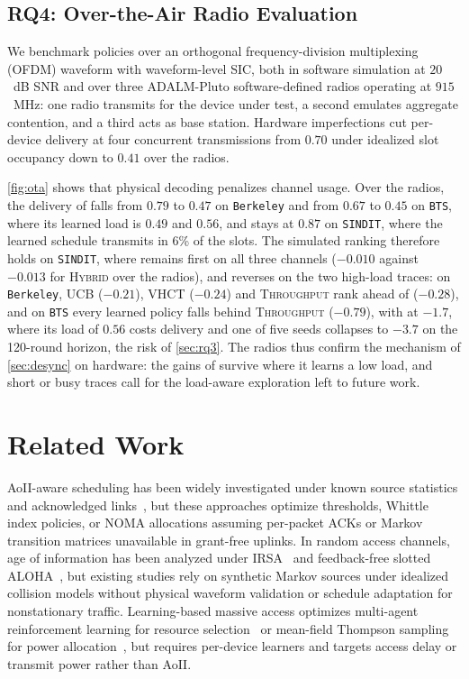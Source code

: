 \documentclass[conference]{IEEEtran}
\begin{document}
\subsection{RQ4: Over-the-Air Radio Evaluation}
\label{sec:rq4}

  We benchmark policies over an orthogonal frequency-division multiplexing (OFDM) waveform with waveform-level SIC, both in software simulation at $20$~dB SNR and over three ADALM-Pluto software-defined radios operating at $915$~MHz: one radio transmits for the device under test, a second emulates aggregate contention, and a third acts as base station.
  Hardware imperfections cut per-device delivery at four concurrent transmissions from $0.70$ under idealized slot occupancy down to $0.41$ over the radios.

  \autoref{fig:ota} shows that physical decoding penalizes channel usage.
  Over the radios, the delivery of \tool falls from $0.79$ to $0.47$ on \texttt{Berkeley} and from $0.67$ to $0.45$ on \texttt{BTS}, where its learned load is $0.49$ and $0.56$, and stays at $0.87$ on \texttt{SINDIT}, where the learned schedule transmits in 6\% of the slots.
  The simulated ranking therefore holds on \texttt{SINDIT}, where \tool remains first on all three channels ($-0.010$ against $-0.013$ for \textsc{Hybrid} over the radios), and reverses on the two high-load traces: on \texttt{Berkeley}, \textsc{UCB} ($-0.21$), \textsc{VHCT} ($-0.24$) and \textsc{Throughput} rank ahead of \tool ($-0.28$), and on \texttt{BTS} every learned policy falls behind \textsc{Throughput} ($-0.79$), with \tool at $-1.7$, where its load of $0.56$ costs delivery and one of five seeds collapses to $-3.7$ on the 120-round horizon, the risk of \autoref{sec:rq3}.
  The radios thus confirm the mechanism of \autoref{sec:desync} on hardware: the gains of \tool survive where it learns a low load, and short or busy traces call for the load-aware exploration left to future work.

\section{Related Work}
\label{sec:related}

  AoII-aware scheduling has been widely investigated under known source statistics and acknowledged links~\cite{maatouk2022age,bountrogiannis2024age,kriouile2023when,hong2024age,tong2023semantic}, but these approaches optimize thresholds, Whittle index policies, or NOMA allocations assuming per-packet ACKs or Markov transition matrices unavailable in grant-free uplinks.
  In random access channels, age of information has been analyzed under IRSA~\cite{munari2021modern,saha2021minimum} and feedback-free slotted ALOHA~\cite{munari2024monitoring,mubarak2026threshold,chiariotti2025distributed}, but existing studies rely on synthetic Markov sources under idealized collision models without physical waveform validation or schedule adaptation for nonstationary traffic.
  Learning-based massive access optimizes multi-agent reinforcement learning for resource selection~\cite{le2022tinyqmix} or mean-field Thompson sampling for power allocation~\cite{le2024mftts}, but requires per-device learners and targets access delay or transmit power rather than AoII.
\end{document}
